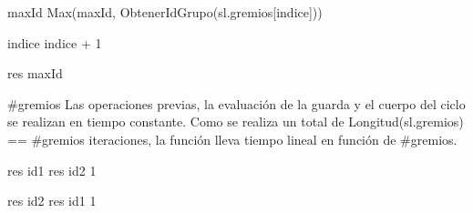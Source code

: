 {
	\state {} 									

	\state
	\state {} 								
							
		\state
		
		\state maxId \asig Max(maxId, ObtenerIdGrupo(sl.gremios[indice]))			

		\state
		\state indice \asig indice + 1								
	\endwhile
	\state

	\state res \asig maxId											
}
{ \#gremios }
{ Las operaciones previas, la evaluaci\'on de la guarda y el cuerpo del ciclo se realizan en tiempo constante. Como se realiza un total de Longitud(sl.gremios) == \#gremios iteraciones, la funci\'on lleva tiempo lineal en funci\'on de \#gremios. }

{
						
		\state res \asig id1			
	\Else
		\state res \asig id2			
	\endif
}
{1}
{}

{
						
		\state res \asig id2			
	\Else
		\state res \asig id1			
	\endif
}
{1}
{}